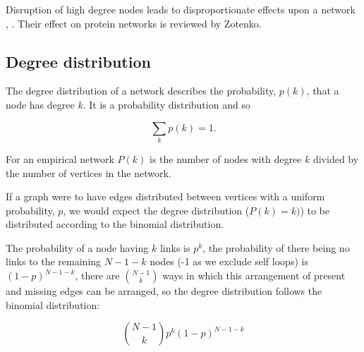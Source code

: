  Disruption of high degree nodes leads to disproportionate effects upon a network \cite{jeong2001lethality}, \cite{albert2000error}. Their effect on protein networks is reviewed by Zotenko\cite{zotenko2008hubs}.


\subsection{Degree distribution}
\label{sec:degree distribution}
The degree distribution of a network describes the probability, $p(k)$, that a  node has degree $k$. It is a probability distribution and so

\begin{equation}
    \sum_k p(k)=1.
\end{equation}

For an empirical network $P(k)$ is the number of nodes with degree $k$ divided by the number of vertices in the network. 



If a graph were to have edges distributed between vertices with a uniform probability, $p$, we would expect the degree distribution ($P(k)=k)$) to be distributed according to the binomial distribution.  

 The probability of a node having $k$ links is $p^k$, the probability of there being no links to the remaining $N-1-k$ nodes (-1 as we exclude self loops) is $(1-p)^{N-1-k}$, there are $\binom{N-1}{k}$ ways in which this arrangement of present and missing edges can be arranged, so the degree distribution follows the binomial distribution\cite{barabasi2016network}:

\begin{equation}
   \binom{N-1}{k}        p^k (1-p)^{N-1-k}
   \label{Equation:BinomialDistributionForDegreeProbability}
\end{equation}

